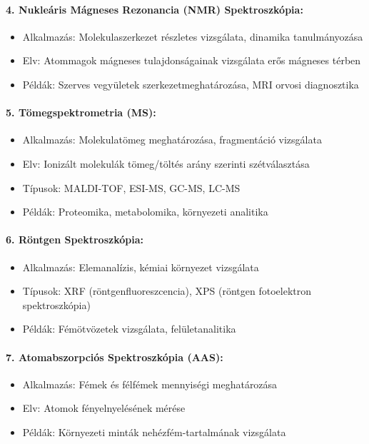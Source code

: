 \documentclass[a4paper,12pt]{article}
\begin{document}
\paragraph{4. Nukleáris Mágneses Rezonancia (NMR) Spektroszkópia:} \begin{itemize} \item Alkalmazás: Molekulaszerkezet részletes vizsgálata, dinamika tanulmányozása \item Elv: Atommagok mágneses tulajdonságainak vizsgálata erős mágneses térben \item Példák: Szerves vegyületek szerkezetmeghatározása, MRI orvosi diagnosztika \end{itemize}

\paragraph{5. Tömegspektrometria (MS):} \begin{itemize} \item Alkalmazás: Molekulatömeg meghatározása, fragmentáció vizsgálata \item Elv: Ionizált molekulák tömeg/töltés arány szerinti szétválasztása \item Típusok: MALDI-TOF, ESI-MS, GC-MS, LC-MS \item Példák: Proteomika, metabolomika, környezeti analitika \end{itemize}

\paragraph{6. Röntgen Spektroszkópia:} \begin{itemize} \item Alkalmazás: Elemanalízis, kémiai környezet vizsgálata \item Típusok: XRF (röntgenfluoreszcencia), XPS (röntgen fotoelektron spektroszkópia) \item Példák: Fémötvözetek vizsgálata, felületanalitika \end{itemize}

\paragraph{7. Atomabszorpciós Spektroszkópia (AAS):} \begin{itemize} \item Alkalmazás: Fémek és félfémek mennyiségi meghatározása \item Elv: Atomok fényelnyelésének mérése \item Példák: Környezeti minták nehézfém-tartalmának vizsgálata \end{itemize}
\end{document}
